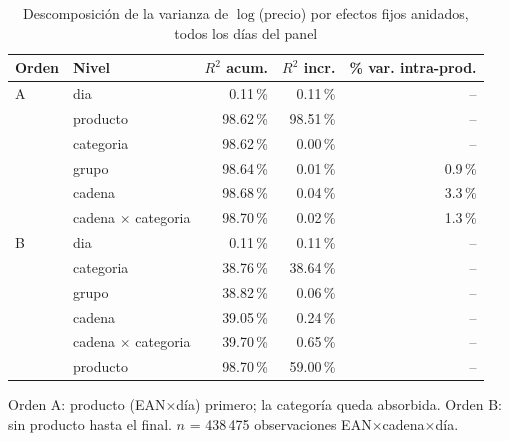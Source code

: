 \begin{table}[htbp]
\caption{Descomposici\'on de la varianza de $\log$(precio) por efectos fijos anidados, todos los d\'ias del panel}
\label{tab:varianza}
\centering\scriptsize\setlength{\tabcolsep}{3pt}
\begin{tabular}{@{}llrrr@{}}
\toprule
Orden & Nivel & $R^2$ acum. & $R^2$ incr. & \% var. intra-prod. \\
\midrule
A & dia & 0.11\,\% & 0.11\,\% & -- \\
 & producto & 98.62\,\% & 98.51\,\% & -- \\
 & categoria & 98.62\,\% & 0.00\,\% & -- \\
 & grupo & 98.64\,\% & 0.01\,\% & 0.9\,\% \\
 & cadena & 98.68\,\% & 0.04\,\% & 3.3\,\% \\
 & cadena $\times$ categoria & 98.70\,\% & 0.02\,\% & 1.3\,\% \\
\midrule
B & dia & 0.11\,\% & 0.11\,\% & -- \\
 & categoria & 38.76\,\% & 38.64\,\% & -- \\
 & grupo & 38.82\,\% & 0.06\,\% & -- \\
 & cadena & 39.05\,\% & 0.24\,\% & -- \\
 & cadena $\times$ categoria & 39.70\,\% & 0.65\,\% & -- \\
 & producto & 98.70\,\% & 59.00\,\% & -- \\
\bottomrule\end{tabular}
\par\smallskip\raggedright\scriptsize Orden A: producto (EAN$\times$d\'ia) primero; la categor\'ia queda absorbida. Orden B: sin producto hasta el final. $n$ = 438\,475 observaciones EAN$\times$cadena$\times$d\'ia.
\end{table}
